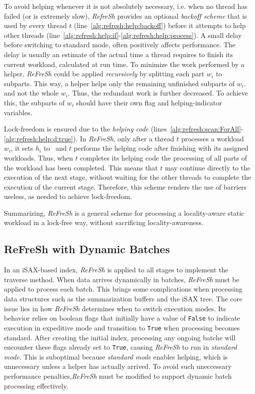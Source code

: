 To avoid helping whenever it is not absolutely necessary, i.e. when no thread has
failed (or is extremely slow), \textit{RefreSh} provides an optional {\em backoff scheme} that is used
by every thread $t$ (line~\ref{alg:refresh:help:backoff}) 
before it attempts to help other threads (line~\ref{alg:refresh:help:if}-\ref{alg:refresh:help:process}).
A small delay before switching to standard mode, often positively affects performance.
The delay is usually an estimate of the actual time a thread requires to finish its
current workload, calculated at run time.
% 
To minimize the work performed by a helper, \textit{ReFreSh} could
be applied  {\em recursively} by splitting each part $w_i$ to subparts. 
This way, a helper helps only the remaining unfinished subparts of $w_i$.
and not the whole $w_i$. Thus, the redundant work is further decreased. 
To achieve this, the subparts of $w_i$ should have their own flag and helping-indicator variables.

Lock-freedom is ensured due to the {\em helping code} (lines~\ref{alg:refresh:scan:ForAll}-
\ref{alg:refresh:help:d:true}). In \textit{ReFreSh}, only after a thread
$t$ processes a workload $w_i$, it sets $h_i$ to \True\, and $t$ performs 
the helping code after finishing with its assigned workloads. Thus, when $t$ completes
its helping code the processing of all parts of the workload has been completed. 
This means that $t$ may continue directly to the execution of the next stage, without
waiting for the other threads to complete the execution of the current stage. 
Therefore, this scheme renders the use of barriers useless, as needed to achieve lock-freedom. 

Summarizing, \textit{ReFreSh} is a general scheme for processing a locality-aware
static workload in a lock-free way, without sacrificing locality-awareness. 


\subsection{\textbf{ReFreSh with Dynamic Batches}}  

In an iSAX-based index, \textit{ReFreSh} is applied to all stages to implement the traverse
method. When data arrives dynamically in batches, \textit{ReFreSh} must be applied to process
each batch. This brings some complications when processing data structures such as the summarization
buffers and the iSAX tree.
% 
The core issue lies in how \textit{ReFreSh} determines when to switch execution modes.
Its behavior relies on boolean flags that initially have a value of \texttt{False} to 
indicate execution in expeditive mode and transition
to \texttt{True} when processing becomes standard. After creating the initial index, processing any
ongoing batche will encounter these flags already set to \texttt{True}, causing \textit{ReFreSh} to 
run in \textit{standard mode}. This is suboptimal because \textit{standard mode} enables helping,
which is unnecessary unless a helper has actually arrived. To avoid such uneccessary performance
penalties,\textit{ReFreSh} must be modified to support dynamic batch processing effectively.  

